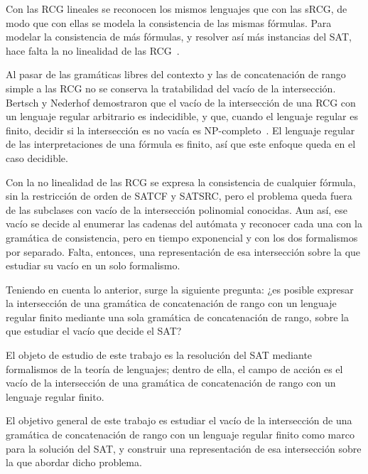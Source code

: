 \documentclass{report}
\begin{document}
Con las RCG lineales se reconocen los mismos lenguajes que con las sRCG,
de modo que con ellas se modela la consistencia de las mismas fórmulas.
Para modelar la consistencia de más fórmulas, y resolver así más
instancias del SAT, hace falta la no linealidad de las RCG~\cite{boullier1998proposal}.

Al pasar de las gramáticas libres del contexto y las de concatenación
de rango simple a las RCG no se conserva la tratabilidad del vacío de la
intersección. Bertsch y Nederhof demostraron que el vacío de la
intersección de una RCG con un lenguaje regular arbitrario es
indecidible, y que, cuando el lenguaje regular es finito, decidir si la
intersección es no vacía es NP-completo~\cite{bertsch2001rcg}. El
lenguaje regular de las interpretaciones de una fórmula es finito, así
que este enfoque queda en el caso decidible.

Con la no linealidad de las
RCG se expresa la consistencia de cualquier fórmula,
sin la restricción de orden de SATCF y SATSRC, pero el problema queda
fuera de las subclases con vacío de la intersección polinomial conocidas.
Aun así, ese vacío se decide al enumerar las cadenas del autómata y
reconocer cada una con la gramática de consistencia, pero en tiempo
exponencial y con los dos formalismos por separado. Falta, entonces, una
representación de esa intersección sobre la que estudiar su vacío en un
solo formalismo.

Teniendo en cuenta lo anterior, surge la siguiente pregunta:
¿es posible expresar la intersección de una gramática de concatenación de
rango con un lenguaje regular finito mediante una sola gramática de
concatenación de rango, sobre la que estudiar el vacío que decide el SAT?

El objeto de estudio de este trabajo es la resolución del SAT mediante
formalismos de la teoría de lenguajes; dentro de ella, el campo de acción
es el vacío de la intersección de una gramática de concatenación de rango
con un lenguaje regular finito.

El objetivo general de este trabajo es estudiar el vacío de la
intersección de una gramática de concatenación de rango con un lenguaje
regular finito como marco para la solución del SAT, y construir una
representación de esa intersección sobre la que abordar dicho problema.
\end{document}
